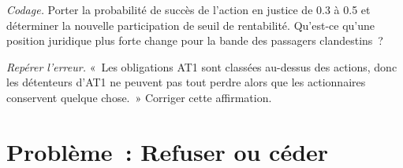 \begin{exercise}[$\star\star\star$]\label{exo:m2:distressed-sovereign-and-bank-capital-credit:7}
\emph{Codage.} Porter la probabilité de succès de l'action en justice de 0.3 à 0.5 et
déterminer la nouvelle participation de seuil de rentabilité. Qu'est-ce qu'une position juridique
plus forte change pour la bande des passagers clandestins~?
\end{exercise}

\begin{exercise}[$\star\star\star$]\label{exo:m2:distressed-sovereign-and-bank-capital-credit:8}
\emph{Repérer l'erreur.} «~Les obligations AT1 sont classées au-dessus des actions, donc les détenteurs d'AT1 ne peuvent pas tout perdre
alors que les actionnaires conservent quelque chose.~» Corriger cette affirmation.
\end{exercise}

\section{Problème~: Refuser ou céder}

